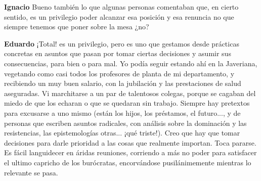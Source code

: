 \documentclass[
  spanish,
  11pt,
  a4paper,
]{scrbook}
\newenvironment{transcripcion}{
    \begin{list}{}{
        \setlength{\leftmargin}{1.5em}  %
        \setlength{\rightmargin}{0em}
        \setlength{\itemsep}{0.2em}     %
        \setlength{\parsep}{0.0em}
        \setlength{\listparindent}{0pt}
    }
}{
    \end{list}
}
\newcommand{\personaje}[1]{\textbf{#1}\quad}
\begin{document}
\begin{transcripcion}
\item \personaje{Ignacio} Bueno también lo que algunas personas comentaban que, en cierto sentido, es un privilegio poder alcanzar esa posición y esa renuncia no que siempre tenemos que poner sobre la mesa ¿no?

\item \personaje{Eduardo} ¡Total! es un privilegio, pero es uno que gestamos desde prácticas concretas en asuntos que pasan por tomar ciertas decisiones y asumir sus consecuencias, para bien o para mal. Yo podía seguir estando ahí en la Javeriana, vegetando como casi todos los profesores de planta de mi departamento, y recibiendo un muy buen salario, con la jubilación y las prestaciones de salud aseguradas. Vi marchitarse a un par de talentosos colegas, porque se cagaban del miedo de que los echaran o que se quedaran sin trabajo. Siempre hay pretextos para excusarse a uno mismo (están los hijos, los préstamos, el futuro..., y de personas que escriben asuntos radicales, con análisis sobre la dominación y las resistencias, las epistemologías otras... ¡qué triste!). Creo que hay que tomar decisiones para darle prioridad a las cosas que realmente importan. Toca pararse. Es fácil languidecer en áridas reuniones, corriendo a más no poder para satisfacer el ultimo capricho de los burócratas, encorvándose pusilánimemente mientras lo relevante se pasa.


\end{transcripcion}
\end{document}
